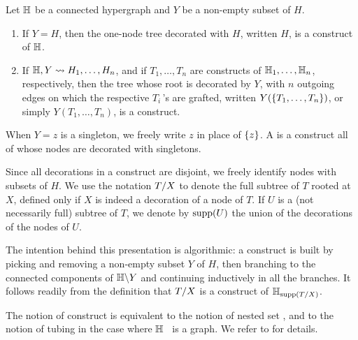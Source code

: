 \begin{definition} 
\label{inductive-construct}
Let ${\mathbb H}$ be a connected hypergraph and $Y$ be a non-empty subset of $H$.
\begin{enumerate}
\item  If $Y = H$, then  the one-node tree decorated with $H$, written $H$, is a construct of ${\mathbb H}$.
\item If ${\mathbb H},Y  \leadsto H_1,\ldots,H_n$, and if  $T_1,\ldots,T_n$ are constructs of ${\mathbb H}_1,\ldots,{\mathbb H}_n$, respectively, then the
tree whose root is decorated by $Y$, with $n$ outgoing edges on which the respective $T_i\,$'s are grafted, written
$Y(\left\{T_1,\ldots,T_n\right\})$, or simply
$Y(T_1,\ldots,T_n)$, is a construct.  
\end{enumerate}
When $Y={z}$ is a singleton, we freely write $z$ in place of $\left\{z\right\}$.
A  is a construct all of whose nodes are  decorated with singletons. 
\end{definition}

Since all decorations in a construct are disjoint, we freely identify nodes with subsets of $H$. 
We use the notation $T/X$ to denote the full subtree of $T$ rooted at $X$, defined only if $X$ is indeed a decoration of a node of $T$. 
If $U$ is a (not necessarily full) subtree of $T$, we denote by $\operatorname{supp}(U)$ the union of the decorations of the nodes of $U$.

\begin{rem} \label{subconstruct-restriction}
The intention behind this presentation is algorithmic: a construct is built by picking and removing a non-empty subset $Y$ of $H$, then branching to the connected components of ${\mathbb H}\backslash Y$ and continuing inductively in all the branches.
It follows readily from the definition that $T/X$ is a construct of ${\mathbb H}_{\operatorname{supp}(T/X)}$.
\end{rem}

\begin{rem}
    The notion of construct is equivalent to the notion of nested set \cite{P09}, and to the notion of tubing in the case where ${\mathbb H}$~\cite{CD-CCGA} is a graph.  
    We refer to \cite[Sec.~3.1]{COI} for details.
\end{rem}


